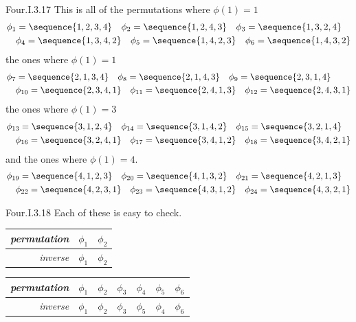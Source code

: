 \begin{ans}{Four.I.3.17}
      This is all of the permutations where $\phi(1)=1$
      \begin{align*}
        &\phi_1=\sequence{1,2,3,4}
        \quad
        \phi_2=\sequence{1,2,4,3}
        \quad
        \phi_3=\sequence{1,3,2,4}  \\
        &\quad
        \phi_4=\sequence{1,3,4,2}
        \quad
        \phi_5=\sequence{1,4,2,3}
        \quad
        \phi_6=\sequence{1,4,3,2}
      \end{align*}
      the ones where $\phi(1)=1$
      \begin{align*}
        &\phi_7=\sequence{2,1,3,4}
        \quad
        \phi_8=\sequence{2,1,4,3}
        \quad
        \phi_9=\sequence{2,3,1,4}    \\
        &\quad
        \phi_{10}=\sequence{2,3,4,1}
        \quad
        \phi_{11}=\sequence{2,4,1,3}
        \quad
        \phi_{12}=\sequence{2,4,3,1}
      \end{align*}
      the ones where $\phi(1)=3$
      \begin{align*}
        &\phi_{13}=\sequence{3,1,2,4}
        \quad
        \phi_{14}=\sequence{3,1,4,2}
        \quad
        \phi_{15}=\sequence{3,2,1,4}  \\
        &\quad
        \phi_{16}=\sequence{3,2,4,1}
        \quad
        \phi_{17}=\sequence{3,4,1,2}
        \quad
        \phi_{18}=\sequence{3,4,2,1}
      \end{align*}
      and the ones where $\phi(1)=4$.
      \begin{align*}
        &\phi_{19}=\sequence{4,1,2,3}
        \quad
        \phi_{20}=\sequence{4,1,3,2}
        \quad
        \phi_{21}=\sequence{4,2,1,3}  \\
        &\quad
        \phi_{22}=\sequence{4,2,3,1}
        \quad
        \phi_{23}=\sequence{4,3,1,2}
        \quad
        \phi_{24}=\sequence{4,3,2,1}
      \end{align*}
    
\end{ans}
\begin{ans}{Four.I.3.18}
      Each of these is easy to check.
      \begin{exparts*}
        \partsitem
          \begin{tabular}[t]{r|cc}
            \textit{permutation} &$\phi_1$  &$\phi_2$ \\
             \hline
            \textit{inverse}     &$\phi_1$  &$\phi_2$
          \end{tabular}
        \partsitem
          \begin{tabular}[t]{r|cccccc}
            \textit{permutation}
              &$\phi_1$ &$\phi_2$ &$\phi_3$ &$\phi_4$ &$\phi_5$ &$\phi_6$ \\
            \hline
            \textit{inverse}
              &$\phi_1$ &$\phi_2$ &$\phi_3$ &$\phi_5$ &$\phi_4$ &$\phi_6$
          \end{tabular}
      \end{exparts*}
    
\end{ans}
